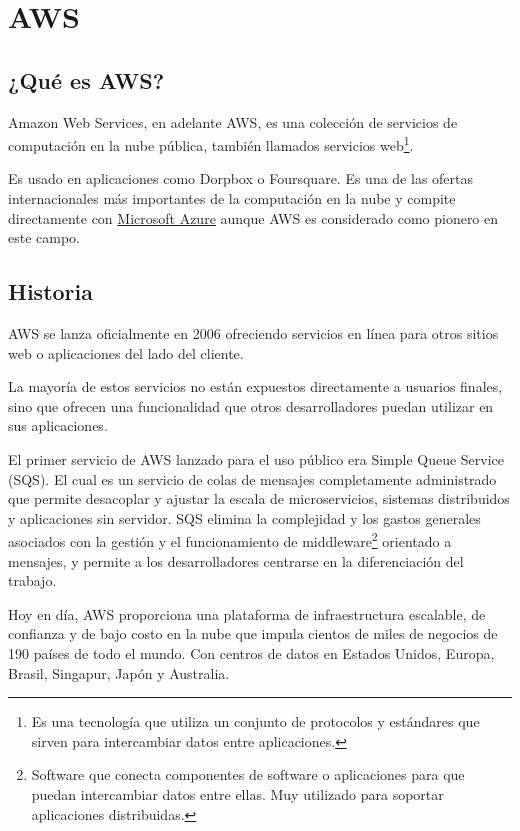 \chapter{AWS}
\hypertarget{AWS}{}
\section{¿Qué es AWS?}
Amazon Web Services, en adelante AWS, es una colección de servicios de computación en la nube pública, también llamados servicios web\footnote{Es una tecnología que utiliza un conjunto de protocolos y estándares que sirven para intercambiar datos entre aplicaciones.}.

Es usado en aplicaciones como Dorpbox o Foursquare. Es una de las ofertas internacionales más importantes de la computación en la nube y compite directamente con \hyperlink{azure}{Microsoft Azure} aunque AWS es considerado como pionero en este campo.

\section{Historia}
AWS se lanza oficialmente en 2006 ofreciendo servicios en línea para otros sitios web o aplicaciones del lado del cliente.

La mayoría de estos servicios no están expuestos directamente a usuarios finales, sino que ofrecen una funcionalidad que otros desarrolladores puedan utilizar en sus aplicaciones.

El primer servicio de AWS lanzado para el uso público era Simple Queue Service (SQS). El cual es un servicio de colas de mensajes completamente administrado que permite desacoplar y ajustar la escala de microservicios, sistemas distribuidos y aplicaciones sin servidor. SQS elimina la complejidad y los gastos generales asociados con la gestión y el funcionamiento de middleware\footnote{Software que conecta componentes de software o aplicaciones para que puedan intercambiar datos entre ellas. Muy utilizado para soportar aplicaciones distribuidas.} orientado a mensajes, y permite a los desarrolladores centrarse en la diferenciación del trabajo.

Hoy en día, AWS proporciona una plataforma de infraestructura escalable, de confianza y de bajo costo en la nube que impula cientos de miles de negocios de 190 países de todo el mundo. Con centros de datos en Estados Unidos, Europa, Brasil, Singapur, Japón y Australia.

